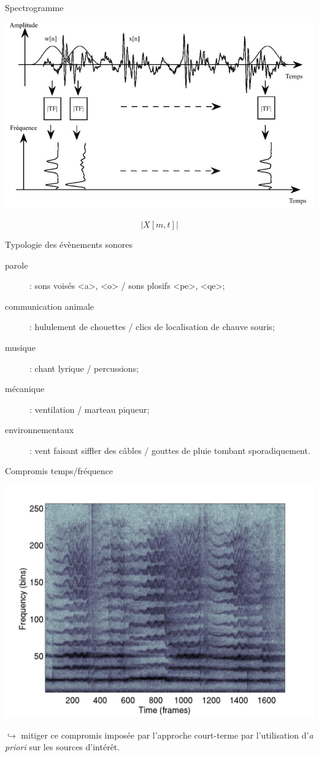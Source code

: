 \documentclass[compress]{beamer}
\begin{document}
\begin{frame}{Spectrogramme}
\begin{center}
\includegraphics[width=.8\columnwidth]{figures/tfct} \\
\end{center}
$$ |X[m, t]|$$
\end{frame}

\begin{frame}{Typologie des évènements sonores}
\begin{description}
  \item[parole] : sons voisés <a>, <o> / sons plosifs <pe>, <qe>;
  \item[communication animale] : hululement de chouettes / clics de localisation de chauve souris;
  \item[musique] : chant lyrique / percussions;
  \item[mécanique] : ventilation / marteau piqueur;
  \item[environnementaux] : vent faisant siffler des câbles / gouttes de pluie tombant sporadiquement.
\end{description}
\end{frame}

\begin{frame}{Compromis temps/fréquence}
\begin{center}
\includegraphics[width=.4\columnwidth]{figures/soloSpec} 
\end{center}
	$\hookrightarrow{}$ mitiger ce compromis imposée par l'approche court-terme par l'utilisation d'\alert{\textit{a priori}} sur les sources d'intérêt.
\end{frame}
\end{document}
